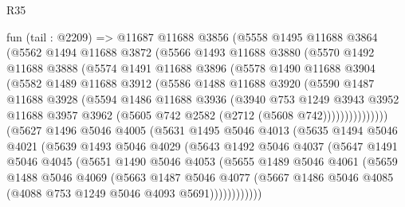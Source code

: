 \begin{lexlean}{R35}
\begin{coremodule}
        fun (tail : @2209) =>
        @11687
          @11688
          @3856
          (@5558
            @1495
            @11688
            @3864
            (@5562
              @1494
              @11688
              @3872
              (@5566
                @1493
                @11688
                @3880
                (@5570
                  @1492
                  @11688
                  @3888
                  (@5574
                    @1491
                    @11688
                    @3896
                    (@5578
                      @1490
                      @11688
                      @3904
                      (@5582
                        @1489
                        @11688
                        @3912
                        (@5586
                          @1488
                          @11688
                          @3920
                          (@5590
                            @1487
                            @11688
                            @3928
                            (@5594
                              @1486
                              @11688
                              @3936
                              (@3940
                                @753
                                @1249
                                @3943
                                @3952
                                @11688
                                @3957
                                @3962
                                (@5605 @742 @2582 (@2712 (@5608 @742)))))))))))))))
        (@5627
          @1496
          @5046
          @4005
          (@5631
            @1495
            @5046
            @4013
            (@5635
              @1494
              @5046
              @4021
              (@5639
                @1493
                @5046
                @4029
                (@5643
                  @1492
                  @5046
                  @4037
                  (@5647
                    @1491
                    @5046
                    @4045
                    (@5651
                      @1490
                      @5046
                      @4053
                      (@5655
                        @1489
                        @5046
                        @4061
                        (@5659
                          @1488
                          @5046
                          @4069
                          (@5663
                            @1487
                            @5046
                            @4077
                            (@5667 @1486 @5046 @4085 (@4088 @753 @1249 @5046 @4093 @5691))))))))))))

\end{coremodule}
\end{lexlean}
